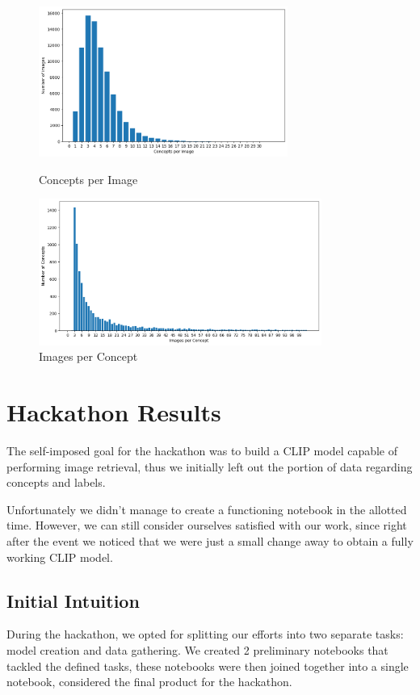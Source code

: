 \documentclass[12pt, a4paper]{article}
\begin{document}
\begin{figure}
        \hspace*{-4.5em}
        \begin{minipage}{25em}
            \centering
            \includegraphics[width=22em]{img/Data_Exploration_2.png}
            \caption{Concepts per Image}
        \end{minipage}
        \begin{minipage}{25em}
            \centering
            \includegraphics[width=25em]{img/Data_Exploration_3.png}
            \caption{Images per Concept}
        \end{minipage}
\end{figure}


\section{Hackathon Results}
The self-imposed goal for the hackathon was to build a CLIP model capable of performing image retrieval, thus we initially left out the portion of data regarding concepts and labels.

Unfortunately we didn't manage to create a functioning notebook in the allotted time.
However, we can still consider ourselves satisfied with our work, since right after the event we noticed that we were just a small change away to obtain a fully working CLIP model.

\subsection{Initial Intuition}
During the hackathon, we opted for splitting our efforts into two separate tasks: model creation and data gathering.
We created 2 preliminary notebooks that tackled the defined tasks, these notebooks were then joined together into a single notebook, considered the final product for the hackathon.
\end{document}
